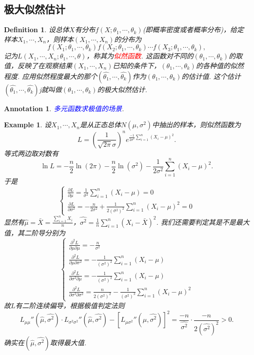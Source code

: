 \documentclass{article}
\newtheorem{example}[theorem]{Example}
\newtheorem{definition}[theorem]{Definition}
\newtheorem{annotation}[theorem]{Annotation}
\newcommand{\redt}[1]{\textcolor{red}{#1}}
\newcommand{\bluet}[1]{\textcolor{blue}{#1}}
\begin{document}
\subsection{极大似然估计}

\begin{definition}
\rm 设总体$X$有分布$f(X;\theta_1,\cdots,\theta_k)$(即概率密度或者概率分布)，给定样本$X_1,\cdots,X_n$，则样本$(X_1,\cdots,X_n)$的分布为
$$
f(X_1;\theta_1,\cdots,\theta_k)f(X_2;\theta_1,\cdots,\theta_k)\cdots f(X_3;\theta_1,\cdots,\theta_k),
$$
记为$L(X_1,\cdots,X_n;\theta_1,\cdots,\theta)$，称其为\redt{似然函数}. 这函数对不同的$(\theta_1,\cdots,\theta_k)$的取值，反映了在观察结果$(X_1,\cdots,X_n)$已知的条件下，$(\theta_1,\cdots,\theta_k)$的各种值的似然程度. 应用似然程度最大的那个$(\widehat{\theta_1},\cdots,\widehat{\theta_k})$作为$(\theta_1,\cdots,\theta_k)$的估计值. 这个估计$(\widehat{\theta_1},\cdots,\widehat{\theta_k})$j就叫做$(\theta_1,\cdots,\theta_k)$的极大似然估计. 
\end{definition}

\begin{annotation}
\rm \bluet{多元函数求极值的场景}.
\end{annotation}

\begin{example}
\rm 设$X_1,\cdots,X_n$是从正态总体$N(\mu,\sigma^2)$中抽出的样本，则似然函数为
$$
L = \left(\frac{1}{\sqrt{2\pi}\sigma}\right)^ne^{\frac{-1}{2\sigma^2}\sum\limits_{i =1}^n (X_i-\mu)^2}.
$$
等式两边取对数有
$$
\ln L =-\frac{n}{2}\ln(2\pi)-\frac{n}{2}\ln(\sigma^2) - \frac{1}{2\sigma^2}\sum\limits_{i =1}^n (X_i-\mu)^2.
$$
于是
$$
\left\{
\begin{array}{ll}
\frac{\partial L}{\partial \mu} = \frac{1}{\sigma^2}\sum\limits_{i =1}^n (X_i-\mu) = 0 \\
\frac{\partial L}{\partial \sigma^2} = - \frac{n}{2\sigma^2} +\frac{1}{2(\sigma^2)^2} \sum\limits_{i =1}^n (X_i-\mu)^2 = 0
\end{array}\right.
$$
显然有$\widehat{\mu} = \bar{X} = \frac{\sum\limits_{i =1}^n X_i}{n}$，$\widehat{\sigma^2} = \frac{1}{n}\sum\limits_{i =1}^n (X_i-\bar{X})^2$. 我们还需要判定其是不是最大值，其二阶导分别为
$$
\left\{
\begin{array}{ll}
\frac{\partial^2L}{\partial \mu\partial \mu} = -\frac{n}{\sigma^2} \\
\frac{\partial^2L}{\partial \mu \partial \sigma^2} =  -\frac{1}{(\sigma^2)^2}\sum\limits_{i =1}^n (X_i-\mu) \\
\frac{\partial^2L}{\partial \sigma^2 \partial \mu} = -\frac{1}{(\sigma^2)^2}\sum\limits_{i =1}^n (X_i-\mu) \\
\frac{\partial^2L}{\partial \sigma^2 \partial \sigma^2} =  \frac{n}{2(\sigma^2)^2} - \frac{1}{(\sigma^2)^3}\sum\limits_{i =1}^n (X_i-\mu)^2
\end{array}\right.
$$
故$L$有二阶连续偏导，根据极值判定法则
$$
L_{\mu\mu}''(\widehat{\mu},\widehat{\sigma^2})\cdot L_{\sigma^2\sigma^2}''(\widehat{\mu},\widehat{\sigma^2}) - \left[L_{\mu\sigma^2}''(\widehat{\mu},\widehat{\sigma^2})\right]^2 = \frac{-n}{\widehat{\sigma^2}}\cdot\frac{-n}{2(\widehat{\sigma^2})^2} > 0.
$$
确实在$(\widehat{\mu},\widehat{\sigma^2})$取得最大值.
\end{example}
\end{document}
